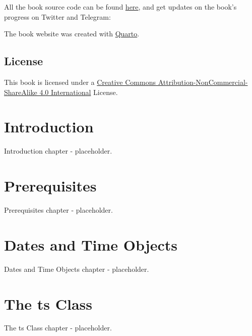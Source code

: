\documentclass[
  letterpaper,
  DIV=11,
  numbers=noendperiod]{scrreprt}
\begin{document}
All the book source code can be found
\href{https://github.com/RamiKrispin/atsaf}{here}, and get updates on
the book's progress on Twitter and Telegram:

The book website was created with \href{https://quarto.org/}{Quarto}.

\hypertarget{license}{%
\section*{License}\label{license}}

This book is licensed under a
\href{https://creativecommons.org/licenses/by-nc-sa/4.0/}{Creative
Commons Attribution-NonCommercial-ShareAlike 4.0 International} License.


\hypertarget{introduction}{%
\chapter{Introduction}\label{introduction}}

Introduction chapter - placeholder.


\hypertarget{prerequisites}{%
\chapter{Prerequisites}\label{prerequisites}}

Prerequisites chapter - placeholder.


\hypertarget{dates-and-time-objects}{%
\chapter{Dates and Time Objects}\label{dates-and-time-objects}}

Dates and Time Objects chapter - placeholder.


\hypertarget{the-ts-class}{%
\chapter{The ts Class}\label{the-ts-class}}

The ts Class chapter - placeholder.

\end{document}
